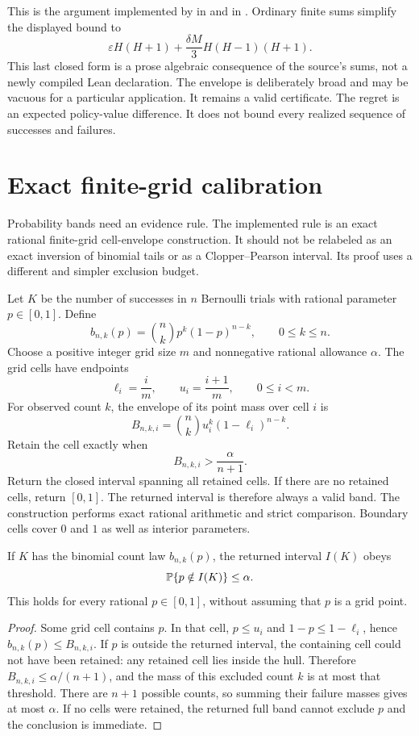 This is the argument implemented by  in
 and
 in .
Ordinary finite sums simplify the displayed bound to
\[
 \varepsilon H(H+1)+\frac{\delta M}{3}H(H-1)(H+1).
\]
This last closed form is a prose algebraic consequence of the source's sums,
not a newly compiled Lean declaration. The envelope is deliberately broad and
may be vacuous for a particular application. It remains a valid certificate.
The regret is an expected policy-value difference. It does not bound every
realized sequence of successes and failures.

\section{Exact finite-grid calibration}
\label{sec:calibration}

Probability bands need an evidence rule. The implemented rule is an exact
rational finite-grid cell-envelope construction. It should not be relabeled as
an exact inversion of binomial tails or as a Clopper--Pearson interval. Its proof
uses a different and simpler exclusion budget.

Let $K$ be the number of successes in $n$ Bernoulli trials with rational
parameter $p\in[0,1]$. Define
\[
 b_{n,k}(p)=\binom nk p^k(1-p)^{n-k},\qquad 0\leq k\leq n.
\]
Choose a positive integer grid size $m$ and nonnegative rational allowance
$\alpha$. The grid cells have endpoints
\[
 \ell_i=\frac{i}{m},\qquad u_i=\frac{i+1}{m},\qquad 0\leq i<m.
\]
For observed count $k$, the envelope of its point mass over cell $i$ is
\[
 B_{n,k,i}=\binom nk u_i^k(1-\ell_i)^{n-k}.
\]
Retain the cell exactly when
\[
 B_{n,k,i}>\frac{\alpha}{n+1}.
\]
Return the closed interval spanning all retained cells. If there are no retained
cells, return $[0,1]$. The returned interval is therefore always a valid band.
The construction performs exact rational arithmetic and strict comparison.
Boundary cells cover $0$ and $1$ as well as interior parameters.

\begin{theorem}
If $K$ has the binomial count law $b_{n,k}(p)$, the returned interval $I(K)$ obeys
\[
 \mathbb P\{p\notin I(K)\}\leq\alpha.
\]
This holds for every rational $p\in[0,1]$, without assuming that $p$ is a grid
point.
\end{theorem}
\begin{proof}
Some grid cell contains $p$. In that cell, $p\leq u_i$ and
$1-p\leq1-\ell_i$, hence $b_{n,k}(p)\leq B_{n,k,i}$. If $p$ is outside the
returned interval, the containing cell could not have been retained: any
retained cell lies inside the hull. Therefore
$B_{n,k,i}\leq\alpha/(n+1)$, and the mass of this excluded count $k$ is at most
that threshold. There are $n+1$ possible counts, so summing their failure masses
gives at most $\alpha$. If no cells were retained, the returned full band cannot
exclude $p$ and the conclusion is immediate.
\end{proof}

